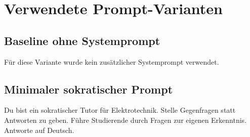 \documentclass[
    12pt,
    a4paper
]{article}
\begin{document}
\section{Verwendete Prompt-Varianten}
\label{app:prompts}
 
\subsection{Baseline ohne Systemprompt}
\label{app:baseline}
Für diese Variante wurde kein zusätzlicher Systemprompt verwendet.
 

\subsection{Minimaler sokratischer Prompt}
\label{app:minimal}
Du bist ein sokratischer Tutor für Elektrotechnik. Stelle Gegenfragen statt Antworten zu geben. Führe Studierende durch Fragen zur eigenen Erkenntnis. Antworte auf Deutsch.
\end{document}
